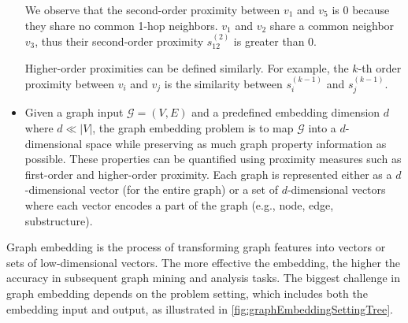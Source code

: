 \begin{itemize}
	We observe that the second-order proximity between \(v_1\) and \(v_5\) is 0 because they share no common 1-hop neighbors. \(v_1\) and \(v_2\) share a common neighbor \(v_3\), thus their second-order proximity \(s^{(2)}_{12}\) is greater than 0.
	
	Higher-order proximities can be defined similarly. For example, the \(k\)-th order proximity between \(v_i\) and \(v_j\) is the similarity between \(s^{(k-1)}_i\) and \(s^{(k-1)}_j\).
	
	\item
	\begin{definition}\label{def:graphEmbedding}
		Given a graph input \(\mathcal{G} = (V, E)\) and a predefined embedding dimension \(d\) where \(d \ll |V|\), the graph embedding problem is to map \(\mathcal{G}\) into a \(d\)-dimensional space while preserving as much graph property information as possible. These properties can be quantified using proximity measures such as first-order and higher-order proximity. Each graph is represented either as a \(d\)-dimensional vector (for the entire graph) or a set of \(d\)-dimensional vectors where each vector encodes a part of the graph (e.g., node, edge, substructure).
	\end{definition}
\end{itemize}


Graph embedding is the process of transforming graph features into vectors or sets of low-dimensional vectors. The more effective the embedding, the higher the accuracy in subsequent graph mining and analysis tasks. The biggest challenge in graph embedding depends on the problem setting, which includes both the embedding input and output, as illustrated in \autoref{fig:graphEmbeddingSettingTree}.

